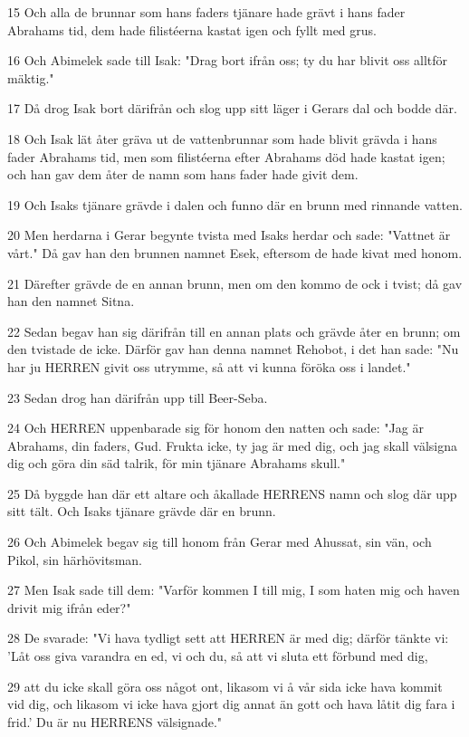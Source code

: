 \par 15 Och alla de brunnar som hans faders tjänare hade grävt i hans fader Abrahams tid, dem hade filistéerna kastat igen och fyllt med grus.
\par 16 Och Abimelek sade till Isak: "Drag bort ifrån oss; ty du har blivit oss alltför mäktig."
\par 17 Då drog Isak bort därifrån och slog upp sitt läger i Gerars dal och bodde där.
\par 18 Och Isak lät åter gräva ut de vattenbrunnar som hade blivit grävda i hans fader Abrahams tid, men som filistéerna efter Abrahams död hade kastat igen; och han gav dem åter de namn som hans fader hade givit dem.
\par 19 Och Isaks tjänare grävde i dalen och funno där en brunn med rinnande vatten.
\par 20 Men herdarna i Gerar begynte tvista med Isaks herdar och sade: "Vattnet är vårt." Då gav han den brunnen namnet Esek, eftersom de hade kivat med honom.
\par 21 Därefter grävde de en annan brunn, men om den kommo de ock i tvist; då gav han den namnet Sitna.
\par 22 Sedan begav han sig därifrån till en annan plats och grävde åter en brunn; om den tvistade de icke. Därför gav han denna namnet Rehobot, i det han sade: "Nu har ju HERREN givit oss utrymme, så att vi kunna föröka oss i landet."
\par 23 Sedan drog han därifrån upp till Beer-Seba.
\par 24 Och HERREN uppenbarade sig för honom den natten och sade: "Jag är Abrahams, din faders, Gud. Frukta icke, ty jag är med dig, och jag skall välsigna dig och göra din säd talrik, för min tjänare Abrahams skull."
\par 25 Då byggde han där ett altare och åkallade HERRENS namn och slog där upp sitt tält. Och Isaks tjänare grävde där en brunn.
\par 26 Och Abimelek begav sig till honom från Gerar med Ahussat, sin vän, och Pikol, sin härhövitsman.
\par 27 Men Isak sade till dem: "Varför kommen I till mig, I som haten mig och haven drivit mig ifrån eder?"
\par 28 De svarade: "Vi hava tydligt sett att HERREN är med dig; därför tänkte vi: 'Låt oss giva varandra en ed, vi och du, så att vi sluta ett förbund med dig,
\par 29 att du icke skall göra oss något ont, likasom vi å vår sida icke hava kommit vid dig, och likasom vi icke hava gjort dig annat än gott och hava låtit dig fara i frid.' Du är nu HERRENS välsignade."
